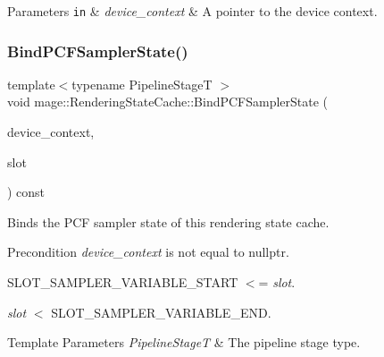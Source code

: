 \begin{DoxyParams}[1]{Parameters}
\mbox{\tt in}  & {\em device\+\_\+context} & A pointer to the device context. \\
\hline
\end{DoxyParams}
\hypertarget{structmage_1_1_rendering_state_cache_ac9625a625115f531d623098199c64de6}{}\label{structmage_1_1_rendering_state_cache_ac9625a625115f531d623098199c64de6} 
\subsubsection{\texorpdfstring{Bind\+P\+C\+F\+Sampler\+State()}{BindPCFSamplerState()}}
{\footnotesize\ttfamily template$<$typename Pipeline\+StageT $>$ \\
void mage\+::\+Rendering\+State\+Cache\+::\+Bind\+P\+C\+F\+Sampler\+State (\begin{DoxyParamCaption}\item[{I\+D3\+D11\+Device\+Context2 $\ast$}]{device\+\_\+context,  }\item[{\hyperlink{namespacemage_af2b398bf98eb10351f49cad73fe2cc73}{u32}}]{slot }\end{DoxyParamCaption}) const\hspace{0.3cm}{\ttfamily [noexcept]}}

Binds the P\+CF sampler state of this rendering state cache.

\begin{DoxyPrecond}{Precondition}
{\itshape device\+\_\+context} is not equal to {\ttfamily nullptr}. 

{\ttfamily S\+L\+O\+T\+\_\+\+S\+A\+M\+P\+L\+E\+R\+\_\+\+V\+A\+R\+I\+A\+B\+L\+E\+\_\+\+S\+T\+A\+RT} $<$= {\itshape slot}. 

{\itshape slot} $<$ {\ttfamily S\+L\+O\+T\+\_\+\+S\+A\+M\+P\+L\+E\+R\+\_\+\+V\+A\+R\+I\+A\+B\+L\+E\+\_\+\+E\+ND}. 
\end{DoxyPrecond}

\begin{DoxyTemplParams}{Template Parameters}
{\em Pipeline\+StageT} & The pipeline stage type. \\
\hline
\end{DoxyTemplParams}

